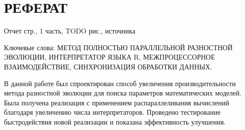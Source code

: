 \chapter*{РЕФЕРАТ}

Отчет \pageref{LastPage} стр., 1 часть, TODO рис.,  источника

Ключевые слова: МЕТОД ПОЛНОСТЬЮ ПАРАЛЛЕЛЬНОЙ РАЗНОСТНОЙ ЭВОЛЮЦИИ, ИНТЕРПРЕТАТОР ЯЗЫКА R, МЕЖПРОЦЕССОРНОЕ ВЗАИМОДЕЙСТВИЕ, СИНХРОНИЗАЦИЯ ОБРАБОТКИ ДАННЫХ.

В данной работе был спроектирован способ увеличения производительности метода разностной эволюции для поиска параметров математических моделей.
Была получена реализация с применением распараллеливания вычислений благодаря увеличению числа интерпретаторов.
Проведено тестирование быстродействия новой реализации и показана эффективность улучшения.


